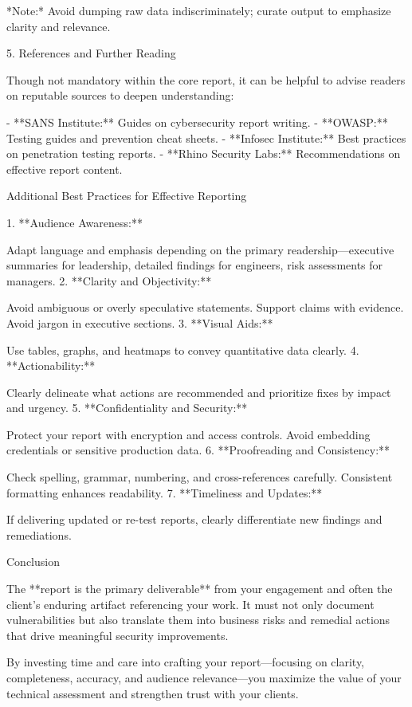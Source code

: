 *Note:* Avoid dumping raw data indiscriminately; curate output to emphasize clarity and relevance.


5. References and Further Reading

Though not mandatory within the core report, it can be helpful to advise readers on reputable sources to deepen understanding:

- **SANS Institute:** Guides on cybersecurity report writing.
- **OWASP:** Testing guides and prevention cheat sheets.
- **Infosec Institute:** Best practices on penetration testing reports.
- **Rhino Security Labs:** Recommendations on effective report content.


Additional Best Practices for Effective Reporting

1. **Audience Awareness:**  

Adapt language and emphasis depending on the primary readership—executive summaries for leadership, detailed findings for engineers, risk assessments for managers.
2. **Clarity and Objectivity:**  

Avoid ambiguous or overly speculative statements. Support claims with evidence. Avoid jargon in executive sections.
3. **Visual Aids:**  

Use tables, graphs, and heatmaps to convey quantitative data clearly.
4. **Actionability:**  

Clearly delineate what actions are recommended and prioritize fixes by impact and urgency.
5. **Confidentiality and Security:**  

Protect your report with encryption and access controls. Avoid embedding credentials or sensitive production data.
6. **Proofreading and Consistency:**  

Check spelling, grammar, numbering, and cross-references carefully. Consistent formatting enhances readability.
7. **Timeliness and Updates:**  

If delivering updated or re-test reports, clearly differentiate new findings and remediations.


Conclusion

The **report is the primary deliverable** from your engagement and often the client's enduring artifact referencing your work. It must not only document vulnerabilities but also translate them into business risks and remedial actions that drive meaningful security improvements.

By investing time and care into crafting your report—focusing on clarity, completeness, accuracy, and audience relevance—you maximize the value of your technical assessment and strengthen trust with your clients.